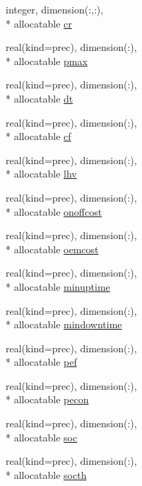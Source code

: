 \begin{DoxyCompactItemize}
integer, dimension(\-:,\-:), \\*
allocatable \hyperlink{classplantvar_a01620e31bb05f1443908f0bff75215a4}{cr}
\item 
real(kind=prec), dimension(\-:), \\*
allocatable \hyperlink{classplantvar_aab06737bb534df1a69fff1f6f601a72a}{pmax}
\item 
real(kind=prec), dimension(\-:), \\*
allocatable \hyperlink{classplantvar_ae10871bcf2f4379bd15a518a314038de}{dt}
\item 
real(kind=prec), dimension(\-:), \\*
allocatable \hyperlink{classplantvar_af0df4533997b17a1fd69f0c152ce2804}{cf}
\item 
real(kind=prec), dimension(\-:), \\*
allocatable \hyperlink{classplantvar_a8c41db489c4d6b494849ab3c82833e29}{lhv}
\item 
real(kind=prec), dimension(\-:), \\*
allocatable \hyperlink{classplantvar_a2e95a86439f2372f77360c8ba1efaaff}{onoffcost}
\item 
real(kind=prec), dimension(\-:), \\*
allocatable \hyperlink{classplantvar_a70a5a58ce085d08a2b8fb1434ab5862c}{oemcost}
\item 
real(kind=prec), dimension(\-:), \\*
allocatable \hyperlink{classplantvar_aa1e10cfba7b7a224f760c1087d2add6d}{minuptime}
\item 
real(kind=prec), dimension(\-:), \\*
allocatable \hyperlink{classplantvar_a9320c1f8ded834439390cb5602c19863}{mindowntime}
\item 
real(kind=prec), dimension(\-:), \\*
allocatable \hyperlink{classplantvar_adae0478dc0dc873750b3f2ff1cd17f47}{pef}
\item 
real(kind=prec), dimension(\-:), \\*
allocatable \hyperlink{classplantvar_a5f4279bfe683122d1505b7df5897ac45}{pecon}
\item 
real(kind=prec), dimension(\-:), \\*
allocatable \hyperlink{classplantvar_abcd233bb37be100040f7c48ba5700daa}{soc}
\item 
real(kind=prec), dimension(\-:), \\*
allocatable \hyperlink{classplantvar_a9cdc1767d27c7362b6c33bc24fbe79ed}{socth}
\item 

\end{DoxyCompactItemize}

